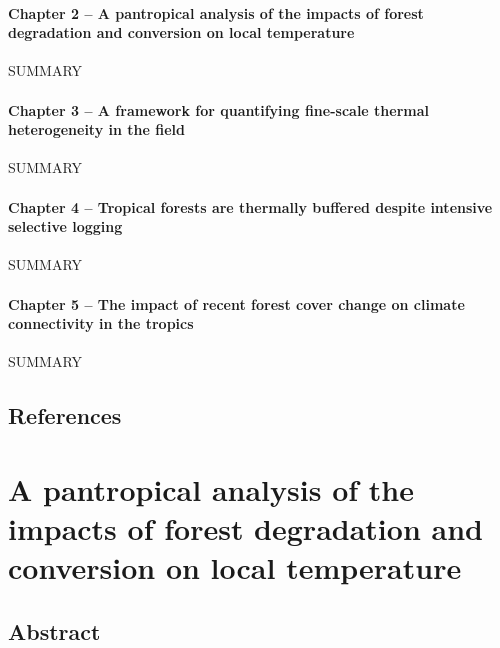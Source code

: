 \documentclass[12pt,a4paper,]{report}
\theoremstyle{definition}
\theoremstyle{definition}
\theoremstyle{definition}
\theoremstyle{remark}
\begin{document}
\subsubsection{Chapter 2 -- A pantropical analysis of the impacts of
forest degradation and conversion on local
temperature}\label{chapter-2-a-pantropical-analysis-of-the-impacts-of-forest-degradation-and-conversion-on-local-temperature}

SUMMARY

\subsubsection{Chapter 3 -- A framework for quantifying fine-scale
thermal heterogeneity in the
field}\label{chapter-3-a-framework-for-quantifying-fine-scale-thermal-heterogeneity-in-the-field}

SUMMARY

\subsubsection{Chapter 4 -- Tropical forests are thermally buffered
despite intensive selective
logging}\label{chapter-4-tropical-forests-are-thermally-buffered-despite-intensive-selective-logging}

SUMMARY

\subsubsection{Chapter 5 -- The impact of recent forest cover change on
climate connectivity in the
tropics}\label{chapter-5-the-impact-of-recent-forest-cover-change-on-climate-connectivity-in-the-tropics}

SUMMARY

\section{References}\label{references}

\chapter{A pantropical analysis of the impacts of forest degradation and
conversion on local
temperature}\label{a-pantropical-analysis-of-the-impacts-of-forest-degradation-and-conversion-on-local-temperature}

\section{Abstract}\label{abstract}
\end{document}
